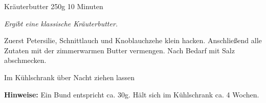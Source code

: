 \begin{recipe}{Kräuterbutter} {250g} {10 Minuten}

\freeform
\textit{Ergibt eine klassische Kräuterbutter.}


Zuerst Petersilie, Schnittlauch und Knoblauchzehe klein hacken.
Anschließend alle Zutaten mit der zimmerwarmen Butter vermengen.
Nach Bedarf mit Salz abschmecken.

\newstep
Im Kühlschrank über Nacht ziehen lassen

\freeform
\hrulefill

\freeform
\textbf{Hinweise:}
Ein Bund entspricht ca. 30g.
Hält sich im Kühlschrank ca. 4 Wochen.

\end{recipe}
